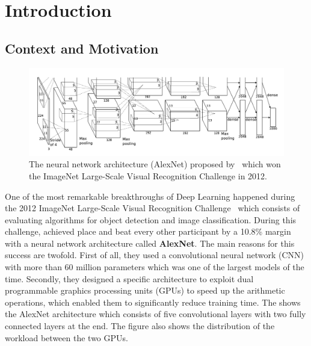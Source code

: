 \chapter{Introduction}
\label{chapter:ch1-introduction}
\localtoc

\section{Context and Motivation}
\label{section:ch1-context_and_motivation}


\begin{figure}[t]
  \centering
  \includegraphics[scale=0.24]{figures/main/ch1-introduction/alexnet.png}
  \caption{The neural network architecture (AlexNet) proposed by~\citet{krizhevsky2012imagenet} which won the ImageNet Large-Scale Visual Recognition Challenge in 2012.}
  \label{figure:ch1-alexnet_network}
\end{figure}


One of the most remarkable breakthroughs of Deep Learning happened during the 2012 ImageNet Large-Scale Visual Recognition Challenge~\cite{ILSVRC15} which consists of evaluating algorithms for object detection and image classification.
During this challenge, \citet{krizhevsky2012imagenet} achieved  place and beat every other participant by a 10.8\% margin with a neural network architecture called \textbf{AlexNet}.
The main reasons for this success are twofold.
First of all, they used a convolutional neural network (CNN) with more than 60 million parameters which was one of the largest models of the time.
Secondly, they designed a specific architecture to exploit dual programmable graphics processing units (GPUs) to speed up the arithmetic operations, which enabled them to significantly reduce training time.
The  shows the AlexNet architecture which consists of five convolutional layers with two fully connected layers at the end.
The figure also shows the distribution of the workload between the two GPUs.

